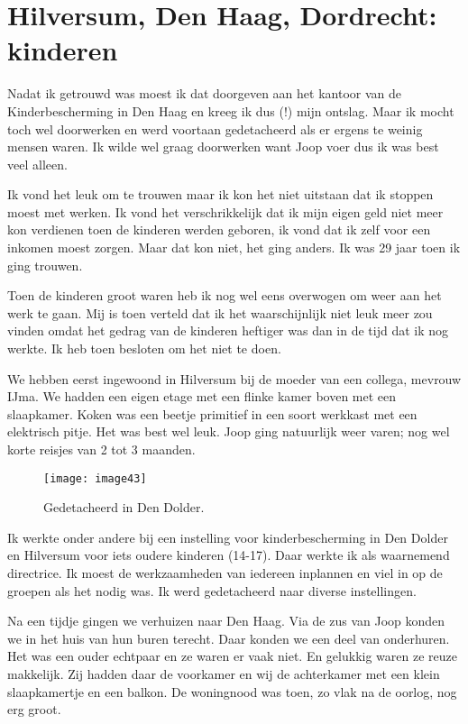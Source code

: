 \chapter*{\label{ref-010}Hilversum, Den Haag, Dordrecht: kinderen}

Nadat ik getrouwd was moest ik dat doorgeven aan het kantoor van de Kinderbescherming in Den Haag en kreeg ik dus (!) mijn ontslag. Maar ik mocht toch wel doorwerken en werd voortaan gedetacheerd als er ergens te weinig mensen waren. Ik wilde wel graag doorwerken want Joop voer dus ik was best veel alleen.

Ik vond het leuk om te trouwen maar ik kon het niet uitstaan dat ik stoppen moest met werken. Ik vond het verschrikkelijk dat ik mijn eigen geld niet meer kon verdienen toen de kinderen werden geboren, ik vond dat ik zelf voor een inkomen moest zorgen. Maar dat kon niet, het ging anders. Ik was 29 jaar toen ik ging trouwen.
 
Toen de kinderen groot waren heb ik nog wel eens overwogen om weer aan het werk te gaan. Mij is toen verteld dat ik het waarschijnlijk niet leuk meer zou vinden omdat het gedrag van de kinderen heftiger was dan in de tijd dat ik nog werkte. Ik heb toen besloten om het niet te doen.

We hebben eerst ingewoond in Hilversum bij de moeder van een collega, mevrouw IJma. We hadden een eigen etage met een flinke kamer boven met een slaapkamer. Koken was een beetje primitief in een soort werkkast met een elektrisch pitje. Het was best wel leuk. Joop ging natuurlijk weer varen; nog wel korte reisjes van 2 tot 3 maanden. 

\begin{figure}[h]
    \texttt{[image: image43]}
    \caption{Gedetacheerd in Den Dolder.}
\end{figure}

 Ik werkte onder andere bij een instelling voor kinderbescherming in Den Dolder en Hilversum voor iets oudere kinderen (14-17). Daar werkte ik als waarnemend directrice. Ik moest de werkzaamheden van iedereen inplannen en viel in op de groepen als het nodig was. Ik werd gedetacheerd naar diverse instellingen.

Na een tijdje gingen we verhuizen naar Den Haag. Via de zus van Joop konden we in het huis van hun buren terecht. Daar konden we een deel van onderhuren. Het was een ouder echtpaar en ze waren er vaak niet. En gelukkig waren ze reuze makkelijk. Zij hadden daar de voorkamer en wij de achterkamer met een klein slaapkamertje en een balkon. De woningnood was toen, zo vlak na de oorlog, nog erg groot. 



